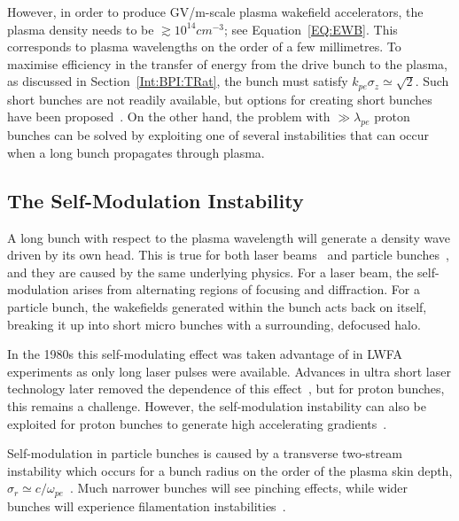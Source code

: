 However, in order to produce GV/m-scale plasma wakefield accelerators, the plasma density needs to be $\gtrsim 10^{14}\unit{cm}^{-3}$; see Equation~\ref{EQ:EWB}.
This corresponds to plasma wavelengths on the order of a few millimetres.
To maximise efficiency in the transfer of energy from the drive bunch to the plasma, as discussed in Section~\ref{Int:BPI:TRat}, the bunch must satisfy $k_{pe}\sigma_{z} \simeq \sqrt{2}$.
Such short bunches are not readily available, but options for creating short bunches have been proposed~\cite{assmann:2009}.
On the other hand, the problem with $\gg\lambda_{pe}$ proton bunches can be solved by exploiting one of several instabilities that can occur when a long bunch propagates through plasma.

\subsection{The Self-Modulation Instability}
\label{Int:DBeam:SMI}

A long bunch with respect to the plasma wavelength will generate a density wave driven by its own head.
This is true for both laser beams~\cite{esarey:1994} and particle bunches~\cite{kumar:2010}, and they are caused by the same underlying physics.
For a laser beam, the self-modulation arises from alternating regions of focusing and diffraction.
For a particle bunch, the wakefields generated within the bunch acts back on itself, breaking it up into short micro bunches with a surrounding, defocused halo.

In the 1980s this self-modulating effect was taken advantage of in LWFA experiments as only long laser pulses were available.
Advances in ultra short laser technology later removed the dependence of this effect~\cite{pukhov:2002}, but for proton bunches, this remains a challenge.
However, the self-modulation instability can also be exploited for proton bunches to generate high accelerating gradients~\cite{schroeder:2012,schroeder:2011,caldwell:2009}.

Self-modulation in particle bunches is caused by a transverse two-stream instability which occurs for a bunch radius on the order of the plasma skin depth, $\sigma_{r} \simeq c/\omega_{pe}$~\cite{vieira:2012}.
Much narrower bunches will see pinching effects, while wider bunches will experience filamentation instabilities~\cite{keinigs:1987}.

